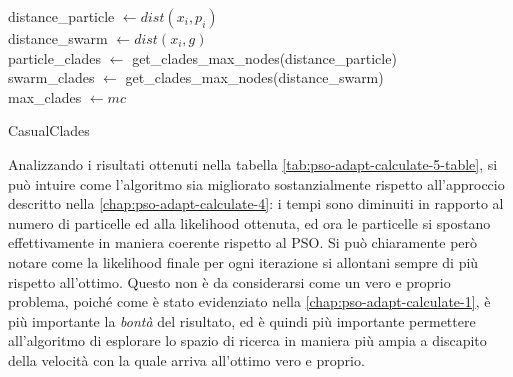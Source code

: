 \begin{algorithm}[H]
    distance\_particle $\gets dist(x_i, p_i)$ \\
    distance\_swarm $\gets dist(x_i, g)$ \\
    particle\_clades $\gets$ get\_clades\_max\_nodes(distance\_particle)\\
    swarm\_clades $\gets$ get\_clades\_max\_nodes(distance\_swarm) \\
    max\_clades $\gets mc$ \\
     
    \caption{CasualClades}
    \label{algo:pso-adapt-calculate-5-algo}
\end{algorithm}
Analizzando i risultati ottenuti nella tabella \autoref{tab:pso-adapt-calculate-5-table}, si può intuire come l'algoritmo sia migliorato sostanzialmente rispetto all'approccio descritto nella \autoref{chap:pso-adapt-calculate-4}: i tempi sono diminuiti in rapporto al numero di particelle ed alla likelihood ottenuta, ed ora le particelle si spostano effettivamente in maniera coerente rispetto al PSO. Si può chiaramente però notare come la likelihood finale per ogni iterazione si allontani sempre di più rispetto all'ottimo. Questo non è da considerarsi come un vero e proprio problema, poiché come è stato evidenziato nella \autoref{chap:pso-adapt-calculate-1}, è più importante la \textit{bontà} del risultato, ed è quindi più importante permettere all'algoritmo di esplorare lo spazio di ricerca in maniera più ampia a discapito della velocità con la quale arriva all'ottimo vero e proprio.

